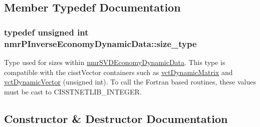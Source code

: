 \subsection{Member Typedef Documentation}
\hypertarget{classnmr_p_inverse_economy_dynamic_data_a32ab8d601abf927292b49d0cea124f9b}{}
\subsubsection[{size\+\_\+type}]{\setlength{\rightskip}{0pt plus 5cm}typedef unsigned int {\bf nmr\+P\+Inverse\+Economy\+Dynamic\+Data\+::size\+\_\+type}}\label{classnmr_p_inverse_economy_dynamic_data_a32ab8d601abf927292b49d0cea124f9b}
Type used for sizes within \hyperlink{classnmr_s_v_d_economy_dynamic_data}{nmr\+S\+V\+D\+Economy\+Dynamic\+Data}. This type is compatible with the cisst\+Vector containers such as \hyperlink{classvct_dynamic_matrix}{vct\+Dynamic\+Matrix} and \hyperlink{classvct_dynamic_vector}{vct\+Dynamic\+Vector} (unsigned int). To call the Fortran based routines, these values must be cast to C\+I\+S\+S\+T\+N\+E\+T\+L\+I\+B\+\_\+\+I\+N\+T\+E\+G\+E\+R. 

\subsection{Constructor \& Destructor Documentation}
\hypertarget{classnmr_p_inverse_economy_dynamic_data_a8544f64bb47204c6dd54a3ed7198c9d5}{}
